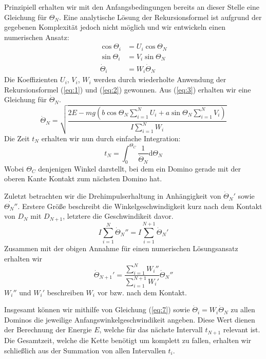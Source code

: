 \documentclass[11pt,a4paper]{scrartcl}
\begin{document}
Prinzipiell erhalten wir mit den Anfangsbedingungen bereits an dieser Stelle
eine Gleichung für $\Theta_N$. Eine analytische Lösung der Rekursionsformel ist
aufgrund der gegebenen Komplexität jedoch nicht möglich und wir entwickeln
einen numerischen Ansatz:
\begin{align}
    \cos{\Theta_i} &= U_i\cos{\Theta_N} \nonumber \\
    \sin{\Theta_i} &= V_i\sin{\Theta_N} \label{eq:3} \\
    \dot{\Theta}_i &= W_i\dot{\Theta}_N \nonumber
\end{align}
Die Koeffizienten $U_i$, $V_i$, $W_i$ werden durch wiederholte Anwendung der
Rekursionsformel (\ref{eq:1}) und (\ref{eq:2}) gewonnen. Aus (\ref{eq:3})
erhalten wir eine Gleichung für $\dot{\Theta}_N$.
\begin{equation}
    \dot{\Theta}_N = \sqrt{\frac{2E - mg
        \left( b\cos{\Theta_N} \sum_{i=1}^N U_i
        + a\sin{\Theta_N} \sum_{i=1}^N V_i \right)}
    {I \sum_{i=1}^N W_i}}
    \label{eq:4}
\end{equation}
Die Zeit $t_N$ erhalten wir nun durch einfache Integration:
\begin{equation}
    t_N = \int_0^{\Theta_C} \frac{1}{\dot{\Theta}_N} \mathrm{d}\Theta_N
    \label{eq:5}
\end{equation}
Wobei $\Theta_C$ denjenigen Winkel darstellt, bei dem ein Domino gerade mit der
oberen Kante Kontakt zum nächsten Domino hat.

Zuletzt betrachten wir die Drehimpulserhaltung in Anhängigkeit von
$\dot{\Theta}_N'$ sowie $\dot{\Theta_N''}$. Erstere Größe beschreibt die
Winkelgeschwindigkeit kurz nach dem Kontakt von $D_N$ mit $D_{N+1}$, letztere
die Geschwindikeit davor.
\begin{equation}
    I \displaystyle\sum_{i=1}^N \dot{\Theta}_N'' =
    I \displaystyle\sum_{i=1}^{N+1} \dot{\Theta}_N'
    \label{eq:6}
\end{equation}
Zusammen mit der obigen Annahme für einen numerischen Lösungsansatz erhalten
wir
\begin{equation}
    \dot{\Theta}_{N+1}' =
        \frac{\sum_{i=1}^{N} W_i''}{\sum_{i=1}^{N+1} W_i'}
        \dot{\Theta}_N''
    \label{eq:7}
\end{equation}
$W_i''$ und $W_i'$ beschreiben $W_i$ vor bzw. nach dem Kontakt.

Insgesamt können wir mithilfe von Gleichung (\ref{eq:7}) sowie $\dot{\Theta}_i
= W_i\dot{\Theta}_N$ zu allen Dominos die jeweilige Anfangswinkelgeschwindikeit
angeben. Diese Wert dienen der Berechnung der Energie $E$, welche für das
nächste Intervall $t_{N+1}$ relevant ist.
Die Gesamtzeit, welche die Kette benötigt um komplett zu fallen, erhalten wir
schließlich aus der Summation von allen Intervallen $t_i$.
\end{document}
